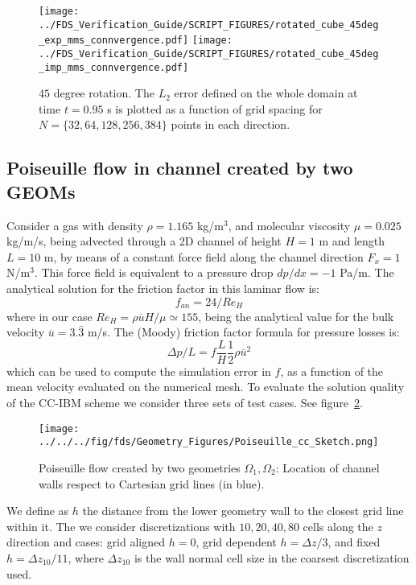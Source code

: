 \documentclass[12pt]{article}
\begin{document}
\begin{figure}[ht]
\centering
\texttt{[image: ../FDS\_Verification\_Guide/SCRIPT\_FIGURES/rotated\_cube\_45deg\_exp\_mms\_connvergence.pdf]}
\texttt{[image: ../FDS\_Verification\_Guide/SCRIPT\_FIGURES/rotated\_cube\_45deg\_imp\_mms\_connvergence.pdf]}
\caption[The {\ct Rotated Cube CC} accuracy order test case]{$45$ degree rotation. The $L_2$ error defined on the whole domain at time $t = 0.95$ s is plotted as a function of grid spacing for $N=\{32,64,128,256,384\}$ points in each direction.}\label{fig:rotcube_cc_45deg_accuracy_order}
\end{figure}




\subsection{Poiseuille flow in channel created by two GEOMs}

Consider a gas with density $\rho=1.165$ kg/m$^3$, and molecular viscosity $\mu=0.025$ kg/m/s, being advected through a 2D channel of height $H=1$ m and length $L=10$ m, by means of a constant force field along the channel direction $F_x=1$ N/m$^3$. This force field is equivalent to a pressure drop $dp/dx=-1$ Pa/m. The analytical solution for the friction factor in this laminar flow is:
%
\begin{equation}
   f_{an} = 24/Re_H
\end{equation}
%
where in our case $Re_H= \rho \overline{u} H/ \mu \simeq 155$, being the analytical value for the bulk velocity $\overline{u}=3.\hat{3}$ m/s. The (Moody) friction factor formula for pressure losses is:
%
\begin{equation}
   \Delta p / L = f \frac{L}{H}  \frac{1}{2} \rho \overline{u}^2
\end{equation}
%
which can be used to compute the simulation error in $f$, as a function of the mean velocity evaluated on the numerical mesh. To evaluate the solution quality of the CC-IBM scheme we consider three sets of test cases. See figure~\ref{Fig:PoiseSketch}.
%
\begin{figure}[h]
      \centering
      \texttt{[image: ../../../fig/fds/Geometry\_Figures/Poiseuille\_cc\_Sketch.png]}
      \caption{Poiseuille flow created by two geometries $\Omega_1, \Omega_2$: Location of channel walls respect to Cartesian grid lines (in blue).}
	\label{Fig:PoiseSketch}
\end{figure}
%
We define as $h$ the distance from the lower geometry wall to the closest grid line within it. The we consider discretizations with ${10,20,40,80}$ cells along the $z$ direction and cases: grid aligned $h=0$, grid dependent $h=\Delta z /3$, and fixed $h=\Delta z_{10}/11$, where $\Delta z_{10}$ is the wall normal cell size in the coarsest discretization used.
\end{document}
